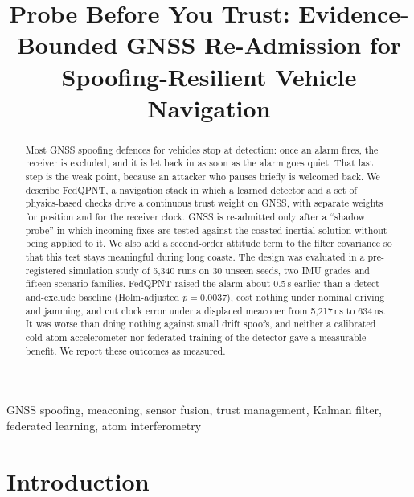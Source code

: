 \documentclass[conference]{IEEEtran}
\begin{document}
\title{Probe Before You Trust: Evidence-Bounded GNSS Re-Admission for Spoofing-Resilient Vehicle Navigation}

\author{
\and
{}
}

\maketitle

\begin{abstract}
Most GNSS spoofing defences for vehicles stop at detection: once an alarm fires, the receiver is excluded, and it is let back in as soon as the alarm goes quiet. That last step is the weak point, because an attacker who pauses briefly is welcomed back. We describe FedQPNT, a navigation stack in which a learned detector and a set of physics-based checks drive a continuous trust weight on GNSS, with separate weights for position and for the receiver clock. GNSS is re-admitted only after a ``shadow probe'' in which incoming fixes are tested against the coasted inertial solution without being applied to it. We also add a second-order attitude term to the filter covariance so that this test stays meaningful during long coasts. The design was evaluated in a pre-registered simulation study of 5{,}340 runs on 30 unseen seeds, two IMU grades and fifteen scenario families. FedQPNT raised the alarm about 0.5\,s earlier than a detect-and-exclude baseline (Holm-adjusted $p=0.0037$), cost nothing under nominal driving and jamming, and cut clock error under a displaced meaconer from 5{,}217\,ns to 634\,ns. It was worse than doing nothing against small drift spoofs, and neither a calibrated cold-atom accelerometer nor federated training of the detector gave a measurable benefit. We report these outcomes as measured.
\end{abstract}

\begin{IEEEkeywords}
GNSS spoofing, meaconing, sensor fusion, trust management, Kalman filter, federated learning, atom interferometry
\end{IEEEkeywords}

\section{Introduction}
\end{document}
